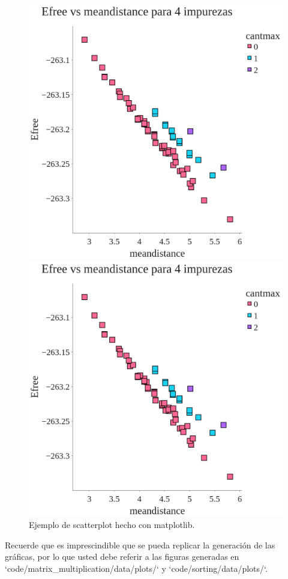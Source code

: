 \begin{figure}[H]
    \centering
    \begin{minipage}[t]{0.5\textwidth}
        \includegraphics[width=\textwidth]{../code/matrix_multiplication/data/plots/4_impurezas_cantmax_size10.png}
    \end{minipage}%
    \begin{minipage}[t]{0.5\textwidth}
        \includegraphics[width=\textwidth]{../code/matrix_multiplication/data/plots/4_impurezas_cantmax_size10.png}
     \end{minipage}%
    \caption{Ejemplo de scatterplot hecho con matplotlib.}
    \label{fig:scatterplot_3}
\end{figure}





\begin{mdframed}
    Recuerde que es imprescindible que se pueda replicar la generación de las gráficas, por lo que usted debe referir a las figuras generadas en `code/matrix\_multiplication/data/plots/` y `code/sorting/data/plots/`.
\end{mdframed}

